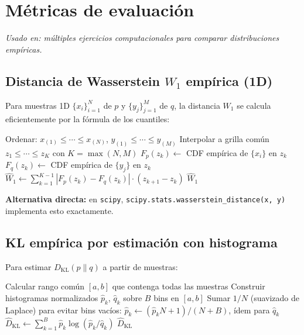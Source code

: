 \section{Métricas de evaluación}
\label{sec:ap_metricas}

\textit{Usado en: múltiples ejercicios computacionales para comparar
distribuciones empíricas.}

\subsection{Distancia de Wasserstein $W_1$ empírica (1D)}
\label{subsec:ap_wasserstein}

Para muestras 1D $\{x_i\}_{i=1}^N$ de $p$ y $\{y_j\}_{j=1}^M$ de $q$,
la distancia $W_1$ se calcula eficientemente por la fórmula de los cuantiles:

\begin{algorithm}[H]
\caption{$W_1$ empírica en 1D}
\label{alg:ap_w1}

Ordenar: $x_{(1)}\leq\cdots\leq x_{(N)}$,
$y_{(1)}\leq\cdots\leq y_{(M)}$\;
Interpolar a grilla común $z_1\leq\cdots\leq z_K$ con $K=\max(N,M)$\;
$F_p(z_k) \leftarrow$ CDF empírica de $\{x_i\}$ en $z_k$\;
$F_q(z_k) \leftarrow$ CDF empírica de $\{y_j\}$ en $z_k$\;
$\hat{W}_1 \leftarrow \sum_{k=1}^{K-1}|F_p(z_k)-F_q(z_k)|\cdot(z_{k+1}-z_k)$\;
\Return $\hat{W}_1$\;
\end{algorithm}

\noindent\textbf{Alternativa directa:} en \texttt{scipy},
\texttt{scipy.stats.wasserstein\_distance(x, y)} implementa esto exactamente.

\subsection{KL empírica por estimación con histograma}
\label{subsec:ap_kl_empirica}

Para estimar $D_{\mathrm{KL}}(p\|q)$ a partir de muestras:

\begin{algorithm}[H]
\caption{KL empírica (histograma)}
\label{alg:ap_kl_emp}

Calcular rango común $[a,b]$ que contenga todas las muestras\;
Construir histogramas normalizados $\hat{p}_k$, $\hat{q}_k$ sobre $B$ bins en $[a,b]$\;
Sumar $1/N$ (suavizado de Laplace) para evitar bins vacíos: $\hat{p}_k \leftarrow
(\hat{p}_k N + 1)/(N + B)$, ídem para $\hat{q}_k$\;
$\hat{D}_{\mathrm{KL}} \leftarrow \sum_{k=1}^B \hat{p}_k\log(\hat{p}_k/\hat{q}_k)$\;
\Return $\hat{D}_{\mathrm{KL}}$\;
\end{algorithm}

